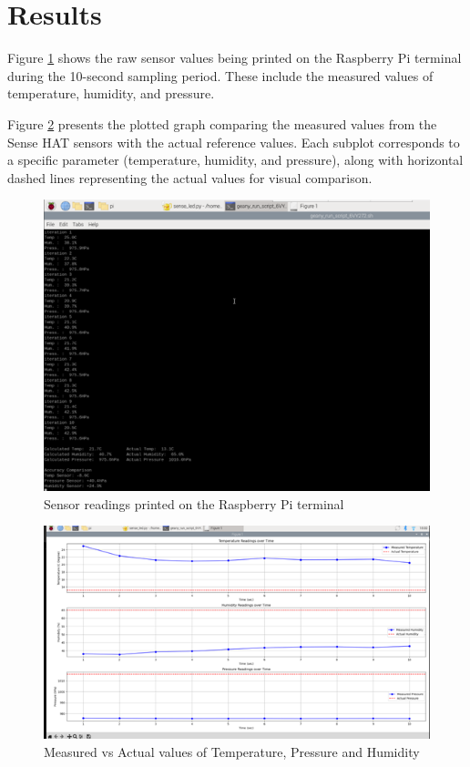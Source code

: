 \documentclass[a4paper,12pt]{article}
\begin{document}
\section{Results}

Figure \ref{fig:terminal} shows the raw sensor values being printed on the Raspberry Pi terminal during the 10-second sampling period. These include the measured values of temperature, humidity, and pressure.

Figure \ref{fig:graph} presents the plotted graph comparing the measured values from the Sense HAT sensors with the actual reference values. Each subplot corresponds to a specific parameter (temperature, humidity, and pressure), along with horizontal dashed lines representing the actual values for visual comparison.

\begin{figure}[H]
    \centering
    \includegraphics[width=\textwidth]{images/terminal_readings.png}
    \caption{Sensor readings printed on the Raspberry Pi terminal}
    \label{fig:terminal}
\end{figure}

\vspace{0.8cm}

\begin{figure}[H]
    \centering
    \includegraphics[width=\textwidth]{images/sensor_graph.png}
    \caption{Measured vs Actual values of Temperature, Pressure and Humidity}
    \label{fig:graph}
\end{figure}
\end{document}
